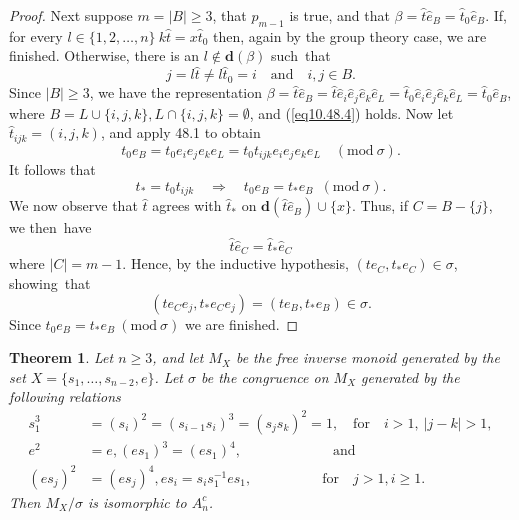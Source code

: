 \documentclass{surv-l}
\numberwithin{equation}{section}
\numberwithin{table}{section}
\numberwithin{figure}{section}
\theoremstyle{plain}
\newtheorem{theorem}[equation]{Theorem}
\theoremstyle{definition}
\begin{document}
\begin{proof}
Next suppose $m=|B|\geq 3$, that $p_{m-1}$ is true, and that
$\beta=\widehat{t}\widehat{e}_{B}=\widehat{t}_{0}\widehat{e}_{B}$.
If, for every $l\in\{1,2,\ldots, n\}\
k\widehat{t}=x\widehat{t}_{0}$ then, again by the group theory
case, we are finished. Otherwise, there is an $l\not\in
\mathbf{d}(\beta)$ such~that
\begin{equation}\label{eq10.48.4}
 j=l\widehat{t}\neq l\widehat{t}_{0}=i\quad \mathrm{and}\quad i,j \in B.
\end{equation}
Since $|B|\geq 3$, we have the representation
$\beta=\widehat{t}\widehat{e}_{B}=\widehat{t}\widehat{e}_{i}\widehat{e}_{j}\widehat{e}_{k}
\widehat{e}_{L}=\widehat{t}_{0}\widehat{e}_{i}\widehat{e}_{j}\widehat{e}_{k}\widehat{e}_{L}
=\widehat{t}_{0}\widehat{e}_{B}$, where $B=L\cup\{i, j, k\},
L\cap\{i, j, k\}=\emptyset$, and (\ref{eq10.48.4}) holds. Now let
$\widehat{t}_{ijk}=(i,j,k)$, and apply 48.1 to obtain
\[
t_{0}e_{B}=t_{0}e_{i}e_{j}e_{k}e_{L}=t_{0}t_{ijk}e_{i}e_{j}e_{k}e_{L}\quad (\mathrm{mod}\ \sigma).
\]
It follows that
\[
t_{\ast}=t_{0}t_{ijk}\quad \Rightarrow\quad t_{0}e_{B}=t_{\ast}e_{B}\enspace (\mathrm{mod}\ \sigma).
\]
We now observe that $\widehat{t}$ agrees with $\widehat{t}_{\ast}$
on $\mathbf{d}(\widehat{t}\widehat{e}_{B})\cup\{x\}$. Thus, if
$C=B-\{j\}$, we then~have
\[
\widehat{t}\widehat{e}_{C}=\widehat{t}_{\ast}\widehat{e}_{C}
\]
where $|C|=m-1$. Hence, by the inductive hypothesis, $(te_{C},
t_{\ast}e_{C})\in\sigma$, showing~that
\[
(te_{C}e_{j}, t_{\ast}e_{C}e_{j})=(te_{B}, t_{\ast}e_{B})\in\sigma.
\]
Since $t_{0}e_{B}=t_{\ast}e_{B}\ (\mathrm{mod}\ \sigma)$ we are
finished.
\end{proof}

\begin{theorem}\label{thm10.48.5}
Let $n\geq 3$, and let $M_{X}$ be the free inverse monoid
generated by the set $X=\{s_{1},\ldots, s_{n-2}, e\}$. Let
$\sigma$ be the congruence on $M_{X}$ generated by the following
relations
\begin{align*}
s_{1}^{3} &=(s_{i})^{2}=(s_{i-1}s_{i})^{3}=(s_{j}s_{k})^{2}=1,\quad  \text{for}\quad i>1,\ |j-k|>1, \\
e^{2}&=e, (es_{1})^{3}= (es_1)^{4},\qquad\qquad\qquad\enspace \text{and} \\
(es_{j})^{2}&=(es_{j})^{4}, es_{i}=s_{i}s_{1}^{-1}es_{1},\qquad\qquad\quad \text{for}\quad j>1, i\geq 1.
\end{align*}
Then $M_{X}/\sigma$ is isomorphic to $A_{n}^{c}$.
\end{theorem}
\end{document}
